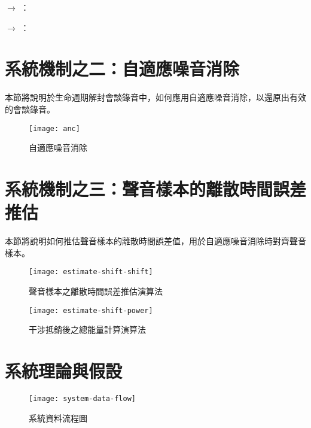 \begin{pmsgs}
    \item \DEFowner $\rightarrow$ \DEFserver：

    \item \DEFserver $\rightarrow$ \DEFowner：

\end{pmsgs}


\section{系統機制之二：自適應噪音消除}
\label{sec:anc}

    本節將說明於生命週期解封會談錄音中，如何應用自適應噪音消除，以還原出有效的會談錄音。

\begin{figure}[H]
    \centering
    \texttt{[image: anc]}
    \caption{自適應噪音消除}
    \label{fig:anc}
\end{figure}


\section{系統機制之三：聲音樣本的離散時間誤差推估}
\label{sec:estimate}

    本節將說明如何推估聲音樣本的離散時間誤差值，用於自適應噪音消除時對齊聲音樣本。

\begin{figure}[H]
    \centering
    \texttt{[image: estimate-shift-shift]}
    \caption{聲音樣本之離散時間誤差推估演算法}
    \label{fig:estimate-shift}
\end{figure}

\begin{figure}[H]
    \centering
    \texttt{[image: estimate-shift-power]}
    \caption{干涉抵銷後之總能量計算演算法}
    \label{fig:estimate-power}
\end{figure}


\section{系統理論與假設}
\label{sec:theory}

\begin{figure}[H]
    \centering
    \texttt{[image: system-data-flow]}
    \caption{系統資料流程圖}
    \label{fig:system-data-flow}
\end{figure}
